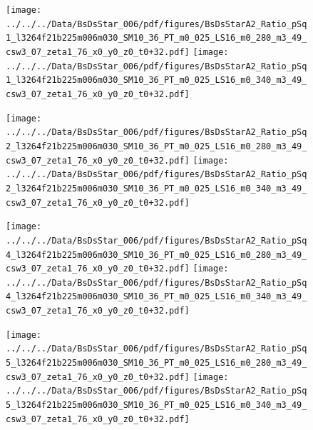 \documentclass[a4paper,10pt]{article}
\begin{document}
\begin{figure}[p]
 \texttt{[image: ../../../Data/BsDsStar\_006/pdf/figures/BsDsStarA2\_Ratio\_pSq1\_l3264f21b225m006m030\_SM10\_36\_PT\_m0\_025\_LS16\_m0\_280\_m3\_49\_csw3\_07\_zeta1\_76\_x0\_y0\_z0\_t0+32.pdf]} 
 \texttt{[image: ../../../Data/BsDsStar\_006/pdf/figures/BsDsStarA2\_Ratio\_pSq1\_l3264f21b225m006m030\_SM10\_36\_PT\_m0\_025\_LS16\_m0\_340\_m3\_49\_csw3\_07\_zeta1\_76\_x0\_y0\_z0\_t0+32.pdf]} 
 \end{figure}
\begin{figure}[p]
 \texttt{[image: ../../../Data/BsDsStar\_006/pdf/figures/BsDsStarA2\_Ratio\_pSq2\_l3264f21b225m006m030\_SM10\_36\_PT\_m0\_025\_LS16\_m0\_280\_m3\_49\_csw3\_07\_zeta1\_76\_x0\_y0\_z0\_t0+32.pdf]} 
 \texttt{[image: ../../../Data/BsDsStar\_006/pdf/figures/BsDsStarA2\_Ratio\_pSq2\_l3264f21b225m006m030\_SM10\_36\_PT\_m0\_025\_LS16\_m0\_340\_m3\_49\_csw3\_07\_zeta1\_76\_x0\_y0\_z0\_t0+32.pdf]} 
 \end{figure}
\begin{figure}[p]
 \texttt{[image: ../../../Data/BsDsStar\_006/pdf/figures/BsDsStarA2\_Ratio\_pSq4\_l3264f21b225m006m030\_SM10\_36\_PT\_m0\_025\_LS16\_m0\_280\_m3\_49\_csw3\_07\_zeta1\_76\_x0\_y0\_z0\_t0+32.pdf]} 
 \texttt{[image: ../../../Data/BsDsStar\_006/pdf/figures/BsDsStarA2\_Ratio\_pSq4\_l3264f21b225m006m030\_SM10\_36\_PT\_m0\_025\_LS16\_m0\_340\_m3\_49\_csw3\_07\_zeta1\_76\_x0\_y0\_z0\_t0+32.pdf]} 
 \end{figure}
\clearpage
\begin{figure}[p]
 \texttt{[image: ../../../Data/BsDsStar\_006/pdf/figures/BsDsStarA2\_Ratio\_pSq5\_l3264f21b225m006m030\_SM10\_36\_PT\_m0\_025\_LS16\_m0\_280\_m3\_49\_csw3\_07\_zeta1\_76\_x0\_y0\_z0\_t0+32.pdf]} 
 \texttt{[image: ../../../Data/BsDsStar\_006/pdf/figures/BsDsStarA2\_Ratio\_pSq5\_l3264f21b225m006m030\_SM10\_36\_PT\_m0\_025\_LS16\_m0\_340\_m3\_49\_csw3\_07\_zeta1\_76\_x0\_y0\_z0\_t0+32.pdf]} 
 \end{figure}
\clearpage
\end{document}

